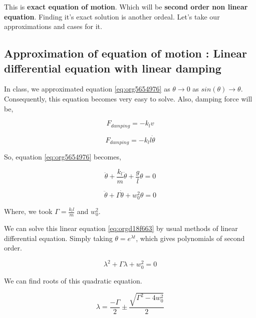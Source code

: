 \documentclass[11pt,a4paper]{article}
\begin{document}
This is \textbf{exact equation of motion}. Which will be \textbf{second order non linear equation}. Finding it's exact solution is another ordeal. Let's take our approximations and cases for it.

\subsection{Approximation of equation of motion : Linear differential equation with linear damping}
\label{sec:org1fd5d8d}

In class, we approximated equation \ref{eq:org5654976} as \(\theta \to 0\) as \(sin(\theta) \to \theta\). Consequently, this equation becomes very easy to solve. Also, damping force will be,

\begin{equation*}
\label{eq:orga490ee2}
F_{damping}=-k_{l}v
\end{equation*}

\begin{equation*}
\label{eq:orgc944a1d}
F_{damping}=-k_{l}l\dot{\theta}
\end{equation*}

So, equation \ref{eq:org5654976} becomes,

\begin{equation}
\label{eq:orgab28870}
\ddot{\theta}+\frac{k_{l}}{m}\dot{\theta}+\frac{g}{l}\theta=0
\end{equation}

\begin{equation}
\label{eq:orgd18f663}
\ddot{\theta}+\Gamma\dot{\theta}+w_{0}^{2}\theta=0
\end{equation}

Where, we took \(\Gamma = \frac{k_{l}l}{m}\) and \(w_{0}^{2}\).

We can solve this linear equation \ref{eq:orgd18f663} by usual methods of linear differential equation. Simply taking \(\theta=e^{\lambda t}\), which gives polynomials of second order.

\begin{equation}
\label{eq:org05c0667}
\lambda^{2}+\Gamma\lambda+w_{0}^{2}=0
\end{equation}

We can find roots of this quadratic equation.

\begin{equation}
\label{eq:org17b034b}
\lambda = \frac{-\Gamma}{2} \pm \frac{\sqrt{\Gamma^{2}-4w_{0}^{2}}}{2}
\end{equation}
\end{document}

